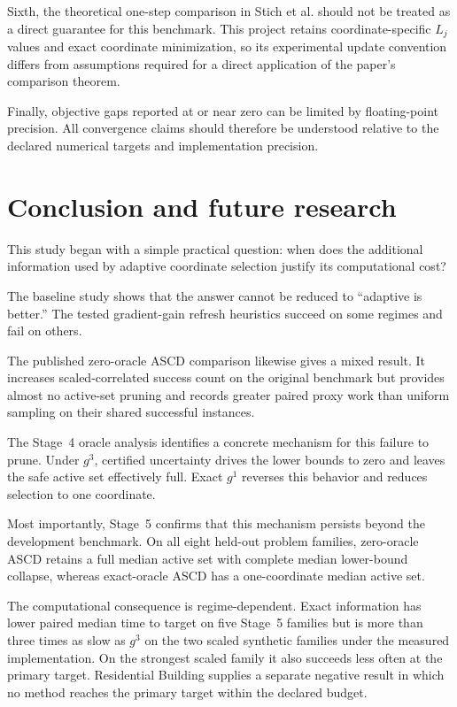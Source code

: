 \documentclass[11pt]{article}
\begin{document}
Sixth, the theoretical one-step comparison in Stich et al. should not be
treated as a direct guarantee for this benchmark. This project retains
coordinate-specific $L_j$ values and exact coordinate minimization, so
its experimental update convention differs from assumptions required
for a direct application of the paper's comparison theorem.

Finally, objective gaps reported at or near zero can be limited by
floating-point precision. All convergence claims should therefore be
understood relative to the declared numerical targets and implementation
precision.


\section{Conclusion and future research}

This study began with a simple practical question: when does the
additional information used by adaptive coordinate selection justify
its computational cost?

The baseline study shows that the answer cannot be reduced to
``adaptive is better.'' The tested gradient-gain refresh heuristics
succeed on some regimes and fail on others.

The published zero-oracle ASCD comparison likewise gives a mixed result.
It increases scaled-correlated success count on the original benchmark
but provides almost no active-set pruning and records greater paired
proxy work than uniform sampling on their shared successful instances.

The Stage~4 oracle analysis identifies a concrete mechanism for this
failure to prune. Under $g^3$, certified uncertainty drives the lower
bounds to zero and leaves the safe active set effectively full. Exact
$g^1$ reverses this behavior and reduces selection to one coordinate.

Most importantly, Stage~5 confirms that this mechanism persists beyond
the development benchmark. On all eight held-out problem families,
zero-oracle ASCD retains a full median active set with complete median
lower-bound collapse, whereas exact-oracle ASCD has a one-coordinate
median active set.

The computational consequence is regime-dependent. Exact information
has lower paired median time to target on five Stage~5 families but is
more than three times as slow as $g^3$ on the two scaled synthetic
families under the measured implementation. On the strongest scaled
family it also succeeds less often at the primary target. Residential
Building supplies a separate negative result in which no method reaches
the primary target within the declared budget.
\end{document}
